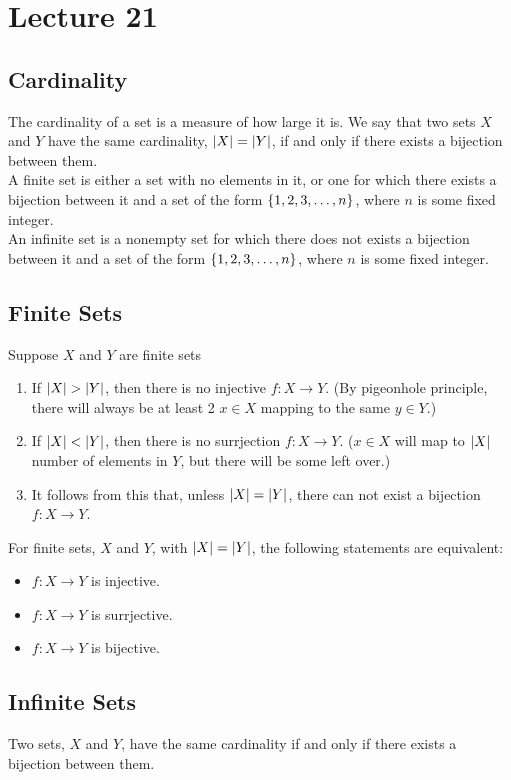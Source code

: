 \documentclass{report}
\begin{document}
\section{Lecture 21}
\subsection*{Cardinality}
The cardinality of a set is a measure of how large it is. We say that two sets $X$ and $Y$ have the same cardinality, $\left| X \right| = \left| Y \right|$, if and only if there exists a bijection between them. \\

A finite set is either a set with no elements in it, or one for which there exists a bijection between it and a set of the form $\left\lbrace 1,2,3,\dots,n \right\rbrace$, where $n$ is some fixed integer. \\

An infinite set is a nonempty set for which there does not exists a bijection between it and a set of the form $\left\lbrace 1,2,3,\dots,n \right\rbrace$, where $n$ is some fixed integer.

\subsection*{Finite Sets}
\Theom Suppose $X$ and $Y$ are finite sets
\begin{enumerate}
	\item If $\left| X \right| > \left| Y \right|$, then there is no injective $f:X\to Y$. (By pigeonhole principle, there will always be at least 2 $x\in X$ mapping to the same $y\in Y$.)
	\item If $\left| X \right| < \left| Y \right|$, then there is no surrjection $f:X\to Y$. ($x\in X$ will map to $\left| X \right|$ number of elements in $Y$, but there will be some left over.)
	\item It follows from this that, unless $\left| X \right|=\left| Y \right|$, there can not exist a bijection $f:X\to Y$.
\end{enumerate}
\Corol For finite sets, $X$ and $Y$, with $\left| X \right|=\left| Y \right|$, the following statements are equivalent:
\begin{itemize}
	\item $f:X\to Y$ is injective.	
	\item $f:X\to Y$ is surrjective.
	\item $f:X\to Y$ is bijective.
\end{itemize}

\subsection*{Infinite Sets}
Two sets, $X$ and $Y$, have the same cardinality if and only if there exists a bijection between them. \\
\end{document}

